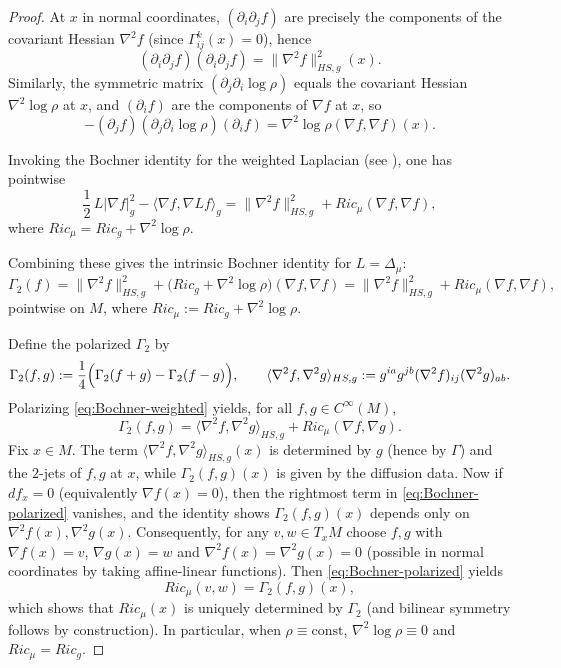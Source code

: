 \documentclass[11pt]{amsart}
\theoremstyle{definition}
\theoremstyle{remark}
\newcommand{\Ric}{Ric}
\begin{document}
\begin{proof}
At $x$ in normal coordinates, $(\partial_i\partial_j f)$ are precisely the components of the
covariant Hessian $\nabla^2 f$ (since $\Gamma^k_{ij}(x)=0$), hence
\[
(\partial_i\partial_j f)(\partial_i\partial_j f)=\|\nabla^2 f\|_{HS,g}^2(x).
\]
Similarly, the symmetric matrix $(\partial_j\partial_i\log\rho)$ equals the covariant Hessian
$\nabla^2\log\rho$ at $x$, and $(\partial_i f)$ are the components of $\nabla f$ at $x$, so
\[
-(\partial_j f)(\partial_j\partial_i\log\rho)(\partial_i f)
=\nabla^2\log\rho(\nabla f,\nabla f)(x).
\]

Invoking the Bochner identity for the weighted Laplacian
(see \cite[Theorem~3.1.2]{BakryGentilLedoux2014}), one has pointwise
\[
\frac12\,L|\nabla f|_g^2-\langle\nabla f,\nabla Lf\rangle_g
=\|\nabla^2 f\|_{HS,g}^2+\Ric_\mu(\nabla f,\nabla f),
\]
where $\Ric_\mu=\Ric_g+\nabla^2\log\rho$.

Combining these gives the intrinsic
Bochner identity for $L=\Delta_\mu$:
\begin{equation}\label{eq:Bochner-weighted}
\Gamma_2(f)
=\|\nabla^2 f\|_{HS,g}^2+\bigl(\Ric_g+\nabla^2\log\rho\bigr)(\nabla f,\nabla f)
=\|\nabla^2 f\|_{HS,g}^2+\Ric_\mu(\nabla f,\nabla f),
\end{equation}
pointwise on $M$, where $\Ric_\mu:=\Ric_g+\nabla^2\log\rho$.

Define the polarized $\Gamma_2$ by
\[
\Gamma_2(f,g):=\frac14\Bigl(\Gamma_2(f+g)-\Gamma_2(f-g)\Bigr),
\qquad
\langle \nabla^2 f,\nabla^2 g\rangle_{HS,g}
:= g^{ia}g^{jb}(\nabla^2 f)_{ij}(\nabla^2 g)_{ab}.
\]
Polarizing \eqref{eq:Bochner-weighted} yields, for all $f,g\in C^\infty(M)$,
\begin{equation}\label{eq:Bochner-polarized}
\Gamma_2(f,g)
=\langle \nabla^2 f,\nabla^2 g\rangle_{HS,g}+\Ric_\mu(\nabla f,\nabla g).
\end{equation}
Fix $x\in M$. The term $\langle \nabla^2 f,\nabla^2 g\rangle_{HS,g}(x)$ is determined by $g$ (hence by
$\Gamma$) and the $2$-jets of $f,g$ at $x$, while $\Gamma_2(f,g)(x)$ is given by the diffusion data.
Now if $df_x=0$ (equivalently $\nabla f(x)=0$), then the rightmost term in \eqref{eq:Bochner-polarized} vanishes,
and the identity shows $\Gamma_2(f,g)(x)$ depends only on $\nabla^2 f(x),\nabla^2 g(x)$.
Consequently, for any $v,w\in T_xM$ choose $f,g$ with $\nabla f(x)=v$, $\nabla g(x)=w$ and
$\nabla^2 f(x)=\nabla^2 g(x)=0$ (possible in normal coordinates by taking affine-linear functions).
Then \eqref{eq:Bochner-polarized} yields
\[
\Ric_\mu(v,w)
=\Gamma_2(f,g)(x),
\]
which shows that $\Ric_\mu(x)$ is uniquely determined by $\Gamma_2$ (and bilinear symmetry follows by construction).
In particular, when $\rho\equiv\mathrm{const}$, $\nabla^2\log\rho\equiv 0$ and $\Ric_\mu=\Ric_g$.
\end{proof}
\end{document}
